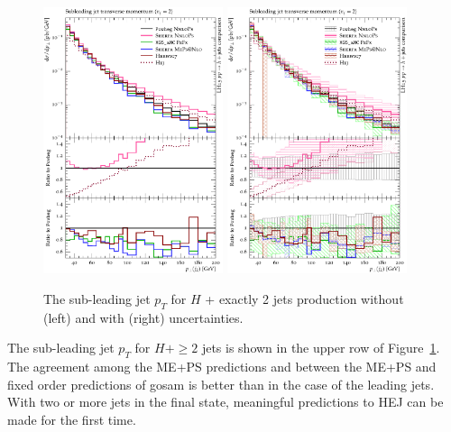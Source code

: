 \begin{figure}[t!]
  \centering
  \includegraphics[width=0.47\textwidth]{figures/hjetscomp_u_jet2_pT_excl.pdf}
  \hfill
  \includegraphics[width=0.47\textwidth]{figures/hjetscomp_jet2_pT_excl.pdf}
  \caption{
    The sub-leading jet $p_T$ for $H$ + exactly 2 jets production without
    (left) and with (right) uncertainties.
    \label{fig:higgscomp:results:2obs:jet2_pt}
  }
\end{figure}

The sub-leading jet $p_T$ for $H+\ge2$ jets is shown in the upper row
of Figure~\ref{fig:higgscomp:results:2obs:jet2_pt}.  The agreement
among the ME+PS predictions and between the ME+PS and fixed order
predictions of gosam is better than in the case of the leading
jets. With two or more jets in the final state, meaningful predictions
to HEJ can be made for the first time.


